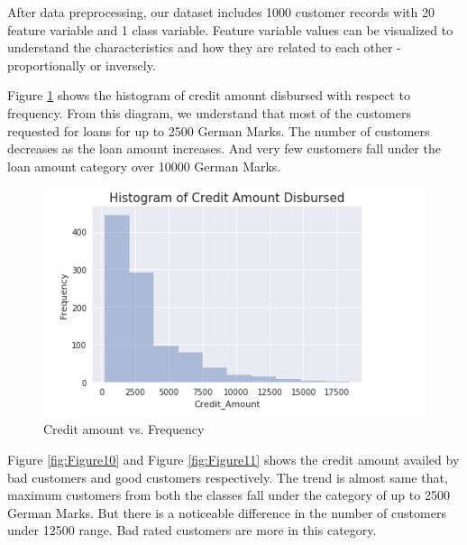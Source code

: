 \documentclass[sigconf]{acmart}
\begin{document}
After data preprocessing, our dataset includes 1000 customer records with 20 feature variable and 1 class variable. Feature variable values can be visualized to understand the characteristics and how they are related to each other - proportionally or inversely. 

Figure \ref{fig:Figure9} shows the histogram of credit amount disbursed with respect to frequency. From this diagram, we understand that most of the customers requested for loans for up to 2500 German Marks. The number of customers decreases as the loan amount increases. And very few customers fall under the loan amount category over 10000 German Marks. 

\begin{figure}[htb]
  \centering
  \includegraphics[width=1.0\columnwidth]{images/Figure9.png}
  \caption{Credit amount vs. Frequency}
  \label{fig:Figure9} 
\end{figure}

Figure \ref{fig:Figure10} and Figure \ref{fig:Figure11} shows the credit amount availed by bad customers and good customers respectively. The trend is almost same that, maximum customers from both the classes fall under the category of up to 2500 German Marks. But there is a noticeable difference in the number of customers under 12500 range. Bad rated customers are more in this category.
\end{document}
